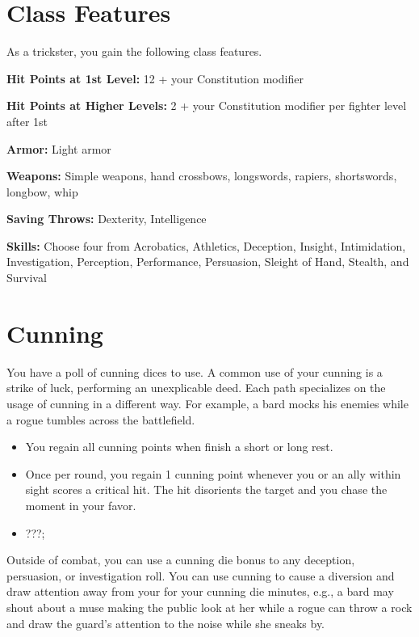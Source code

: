 \begin{multicols*}{2}

\section*{Class Features} 

As a trickster, you gain the following class features.

\textbf{
Hit Points at 1st Level:} 12 + your Constitution modifier

\textbf{Hit Points at Higher Levels:} 2 + your Constitution modifier per fighter level after 1st


\textbf{Armor:} Light armor

\textbf{Weapons:} Simple weapons, hand crossbows, longswords, rapiers, shortswords, longbow, whip

\textbf{Saving Throws:} Dexterity, Intelligence

\textbf{Skills:} Choose four from Acrobatics, Athletics, Deception, Insight, Intimidation, Investigation, Perception, Performance, Persuasion, Sleight of Hand, Stealth, and Survival
    
\section*{Cunning} 

You have a poll of cunning dices to use. A common use of your cunning is a strike of luck, performing an unexplicable deed. Each path specializes on the usage of cunning in a different way. For example, a bard mocks his enemies while a rogue tumbles across the battlefield.



\begin{itemize}
    \item You regain all cunning points when finish a short or long rest.
    \item Once per round, you regain 1 cunning point whenever you or an ally within sight scores a critical hit. The hit disorients the target and you chase the moment in your favor.
    \item ???;
\end{itemize}

Outside of combat, you can use a cunning die bonus to any deception, persuasion, or investigation roll. You can use cunning to cause a diversion and draw attention away from your for your cunning die minutes, e.g., a bard may shout about a muse making the public look at her while a rogue can throw a rock and draw the guard's attention to the noise while she sneaks by.


\end{multicols*}

